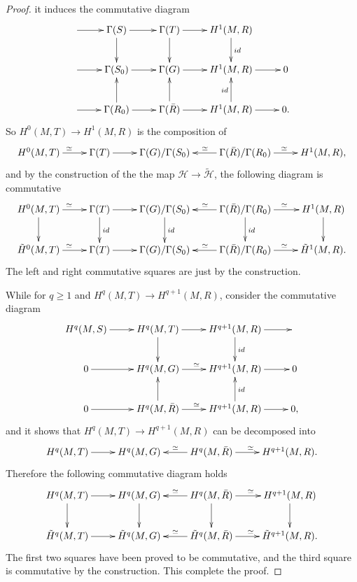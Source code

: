 \documentclass[twoside]{article}
\begin{document}
\begin{proof}
it induces the commutative diagram \begin{equation*}
  \xymatrix{
  \ar[r]&\Gamma(S)\ar[r]\ar[d]&\Gamma(T)\ar[r]\ar[d]&H^1(M,R)\ar[d]^{id}&\\
  \ar[r]&\Gamma(S_0)\ar[r]&\Gamma(G)\ar[r]&H^1(M,R)\ar[r]&0\\
  \ar[r]&\Gamma(R_0)\ar[u]\ar[r]&\Gamma(\bar{R})\ar[u]\ar[r]&H^1(M,R)\ar[u]^{id}\ar[r]&0.\\
  }
\end{equation*}
So $H^0(M,T)\to H^1(M,R)$ is the composition of \begin{equation*}
  \xymatrix{
  H^0(M,T)\ar[r]^{\simeq }&\Gamma(T)\ar[r]&\Gamma(G)/\Gamma(S_0)&\Gamma(\bar{R})/\Gamma(R_0)\ar[l]_{\simeq}\ar[r]^{\simeq}& H^1(M,R),
  }
\end{equation*}
and by the construction of the the map $\mathscr{H}\to \tilde{\mathscr{H}}$, the following diagram is commutative\begin{equation*}
  \xymatrix{
  H^0(M,T)\ar[d]\ar[r]^{\simeq }&\Gamma(T)\ar[d]^{id}\ar[r]&\Gamma(G)/\Gamma(S_0)\ar[d]^{id}&\Gamma(\bar{R})/\Gamma(R_0)\ar[d]^{id}\ar[l]_{\simeq}\ar[r]^{\simeq}& H^1(M,R)\ar[d]\\
  \tilde{H}^0(M,T)\ar[r]^{\simeq }&\Gamma(T)\ar[r]&\Gamma(G)/\Gamma(S_0)&\Gamma(\bar{R})/\Gamma(R_0)\ar[l]_{\simeq}\ar[r]^{\simeq}& \tilde{H}^1(M,R).\\
  }
\end{equation*} The left and right commutative squares are just by the construction.

While for $q\geq 1$ and $H^q(M,T)\to H^{q+1}(M,R)$, consider the commutative diagram \begin{equation*}
  \xymatrix{
  H^q(M,S)\ar[r] & H^q(M,T)\ar[r]\ar[d]&H^{q+1}(M,R)\ar[r]\ar[d]^{id}&\\
  0\ar[r]&H^q(M,G)\ar[r]^{\simeq } &H^{q+1}(M,R)\ar[r]&0\\
  0\ar[r]&H^q(M,\bar{R})\ar[r]^\simeq \ar[u]&H^{q+1}(M,R)\ar[u]_{id}\ar[r]&0,\\
  }
\end{equation*}
and it shows that $H^q(M,T)\to H^{q+1}(M,R)$ can be decomposed into \begin{equation*}
  \xymatrix{
  H^q(M,T)\ar[r]&H^q(M,G)&H^q(M,\bar{R})\ar[l]_{\simeq }\ar[r]^{\simeq } &H^{q+1}(M,R).\\
  }
\end{equation*}
Therefore  the following commutative diagram holds \begin{equation*}
  \xymatrix{
  H^q(M,T)\ar[d]\ar[r]&H^q(M,G)\ar[d]&H^q(M,\bar{R})\ar[d]\ar[l]_{\simeq }\ar[r]^{\simeq } &H^{q+1}(M,R)\ar[d]\\
  \tilde{H}^q(M,T)\ar[r]&\tilde{H}^q(M,G)&\tilde{H}^q(M,\bar{R})\ar[l]_{\simeq }\ar[r]^{\simeq } &\tilde{H}^{q+1}(M,R).\\
  }
\end{equation*}
The first two squares have been proved to be commutative, and the third square is commutative by the construction. This complete the proof.
\end{proof}
\end{document}
